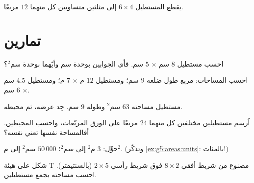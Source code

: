 \begin{omfigure}

{\small {} يقطع المستطيل $6 \times 4$ إلى مثلثين متساويين
 كل منهما $12$ مربعًا.}
\end{omfigure}

\section{تمارين}

\begin{exercise}[$\star$]\label{exo:g5:areas:1}
احسب   مستطيل $8$ سم $\times$
$5$ سم. فأي الجوابين بوحدة سم وأيّهما بوحدة سم$^2$؟
\end{exercise}

\begin{exercise}[$\star$]\label{exo:g5:areas:2}
احسب المساحات: مربع طول ضلعه $9$ سم؛ ومستطيل
$12$ م $\times$ $7$ م؛ ومستطيل $4.5$ سم $\times$ $6$ سم.
\end{exercise}

\begin{exercise}[$\star$]\label{exo:g5:areas:3}
مستطيل مساحته $63$ سم$^2$ وطوله $9$ سم. جِد عرضه،
ثم محيطه.
\end{exercise}

\begin{exercise}[$\star$]\label{exo:g5:areas:4}
اُرسم مستطيلين مختلفين  كل منهما $24$ مربعًا على الورق
المربّعات، واحسب المحيطين. أفالمساحة نفسها تعني  نفسه؟
\end{exercise}

\begin{exercise}[$\star$]\label{exo:g5:areas:5}
حوِّل: $3$ م$^2$ إلى سم$^2$؛ \quad $50\,000$ سم$^2$ إلى م$^2$.
(وتذكّر \cref{ex:g5:areas:units}: بالمئات!)
\end{exercise}

\begin{exercise}[$\star$]\label{exo:g5:areas:6}
شكل على هيئة T مصنوع من شريط أفقي $8 \times 2$ فوق
شريط رأسي $2 \times 5$ (بالسنتيمتر). احسب مساحته بجمع
مستطيلين.
\end{exercise}


